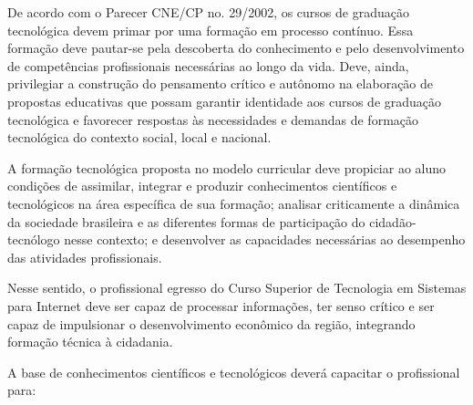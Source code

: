 De acordo com o Parecer CNE/CP no. 29/2002, os cursos de graduação tecnológica devem primar por uma formação em processo contínuo. Essa formação deve pautar-se pela descoberta do conhecimento e pelo desenvolvimento de competências profissionais necessárias ao longo da vida. Deve, ainda, privilegiar a construção do pensamento crítico e autônomo na elaboração de propostas educativas que possam garantir identidade aos cursos de graduação tecnológica e favorecer respostas às necessidades e demandas de formação tecnológica do contexto social, local e nacional.

A formação tecnológica proposta no modelo curricular deve propiciar ao aluno condições de assimilar, integrar e produzir conhecimentos científicos e tecnológicos na área específica de sua formação; analisar criticamente a dinâmica da sociedade brasileira e as diferentes formas de participação do cidadão-tecnólogo nesse contexto; e desenvolver as capacidades necessárias ao desempenho das atividades profissionais.

Nesse sentido, o profissional egresso do Curso Superior de Tecnologia em Sistemas para Internet deve ser capaz de processar informações, ter senso crítico e ser capaz de impulsionar o desenvolvimento econômico da região, integrando formação técnica à cidadania.

A base de conhecimentos científicos e tecnológicos deverá capacitar o profissional para:

